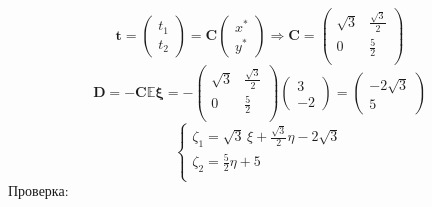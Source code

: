 \documentclass[12pt]{spbstu-task}
\begin{document}
\begin{displaymath}
  \mathbf{t} = \begin{pmatrix} t_1 \\ t_2 \end{pmatrix} =
  \mathbf{C}\begin{pmatrix} x^* \\ y^* \end{pmatrix} \Rightarrow \mathbf{C} = \begin{pmatrix}
    \sqrt{3} & \frac{\sqrt{3}}{2} \\
    0 & \frac{5}{2} \\
  \end{pmatrix}
\end{displaymath}
\begin{displaymath}
  \mathbf{D} = -\mathbf{C}\mathbb{E}\boldsymbol{\xi} = -\begin{pmatrix}
    \sqrt{3} & \frac{\sqrt{3}}{2} \\
    0 & \frac{5}{2} \\
  \end{pmatrix}\begin{pmatrix}3 \\ -2\end{pmatrix} = \begin{pmatrix}
    -2\sqrt{3} \\ 5
  \end{pmatrix}
\end{displaymath}
\begin{displaymath}
  \begin{cases}
    \zeta_1 = \sqrt{3}\,\xi + \frac{\sqrt{3}}{2}\eta - 2\sqrt{3} \\
    \zeta_2 = \frac{5}{2}\eta + 5 \\
  \end{cases}
\end{displaymath}
Проверка:
\end{document}
